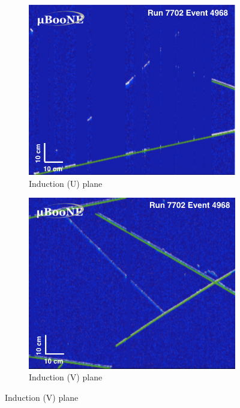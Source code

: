\documentclass[a4paper]{scrartcl}
\begin{document}
\begin{figure}[htbp]
  \begin{center}
    \begin{subfigure}{0.3\textwidth}
      \includegraphics[width=\linewidth]{figures/u.png}
      \caption{Induction (U) plane} \label{fig:u}
    \end{subfigure}
    \begin{subfigure}{0.3\textwidth}
      \includegraphics[width=\linewidth]{figures/v.png}
      \caption{Induction (V) plane} \label{fig:v}
    \end{subfigure}

\end{center}
\end{figure}
\end{document}
